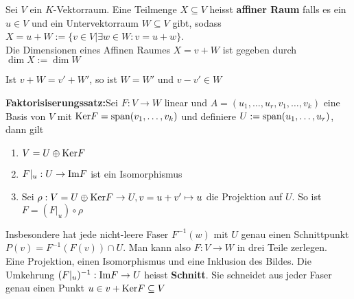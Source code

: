 \begin{mdframed}
Sei $V$ ein $K$-Vektorraum. Eine Teilmenge $X \subseteq V$ heisst \textbf{affiner Raum} falls es ein $u \in V$
und ein Untervektorraum $W \subseteq V$ gibt, sodass $X = u + W := \{v \in V \big\vert \exists w \in W: v = u + w\}$.\\
Die Dimensionen eines Affinen Raumes $X = v + W$ ist gegeben durch $\dim X := \dim W$
\end{mdframed}
Ist $v + W = v' + W'$, so ist $W = W'$ und $v - v' \in W$
\begin{mdframed}
\textbf{Faktorisiserungssatz:}\quad Sei $F: V \rightarrow W$ linear und $A = (u_1, \ldots, u_r, v_1, \ldots, v_k)$ eine Basis von $V$ mit $\text{Ker} F = \text{span}(v_1, \ldots, v_k)$ und definiere $U:= \text{span}(u_1, \ldots, u_r)$, dann gilt
\begin{enumerate}[{(}1{.)}]
    \item	$V = U \oplus \text{Ker} F$
    
    \item $F |_{u} : U \rightarrow \text{Im} F$ ist ein Isomorphismus
    
    \item Sei $\rho: V = U \oplus \text{Ker} F \rightarrow U, v = u + v' \mapsto u$ die Projektion auf $U$. So ist $F = (F |_{u}) \circ \rho$
\end{enumerate}
\begin{center}
\end{center}
\end{mdframed}
Insbesondere hat jede nicht-leere Faser $F^{-1}(w)$ mit $U$ genau einen Schnittpunkt $P(v) = F^{-1}(F(v)) \cap U$. Man kann also $F: V \rightarrow W$ in drei Teile zerlegen.\\
Eine Projektion, einen Isomorphismus und eine Inklusion des Bildes. Die Umkehrung $(F|_{u})^{-1}: \text{Im} F \rightarrow U$ heisst \textbf{Schnitt}. Sie schneidet aus jeder Faser genau einen Punkt $u \in v + \text{Ker} F \subseteq V$





